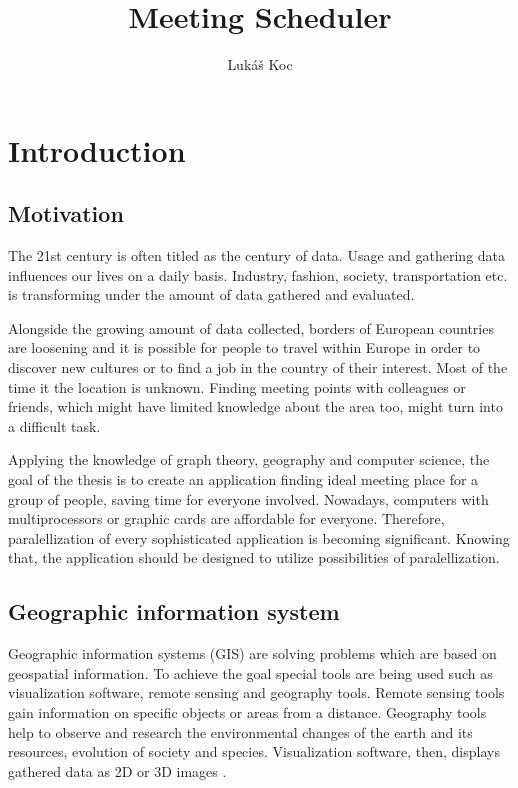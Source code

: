 \documentclass[thesis=M,english]{FITthesis}[2012/10/20]
\title{Meeting Scheduler}
\author{Luk{\' a}{\v s} Koc} %
\begin{document}

\chapter{Introduction}

\section{Motivation}
The 21st century is often titled as the century of data. Usage and gathering data influences our lives on a daily basis. Industry, fashion, society, transportation etc. is transforming under the amount of data gathered and evaluated. 

Alongside the growing amount of data collected, borders of European countries are loosening and it is possible for people to travel within Europe in order to discover new cultures or to find a job in the country of their interest. Most of the time it the location is unknown. Finding meeting points with colleagues or friends, which might have limited knowledge about the area too, might turn into a difficult task.

Applying the knowledge of graph theory, geography and computer science, the goal of the thesis is to create an application finding ideal meeting place for a group of people, saving time for everyone involved.
Nowadays, computers with multiprocessors or graphic cards are affordable for everyone. Therefore, paralellization of every sophisticated application is becoming significant. Knowing that, the application should be designed to utilize possibilities of paralellization.

\section{Geographic information system}
Geographic information systems (GIS) are solving problems which are based on geospatial information. To achieve the goal special tools are being used such as visualization software, remote sensing and geography tools. Remote sensing tools gain information on specific objects or areas from a distance. Geography tools help to observe and research the environmental changes of the earth and its resources, evolution of society and species. Visualization software, then, displays gathered data as 2D or 3D images \cite{Chen10}.
\end{document}
